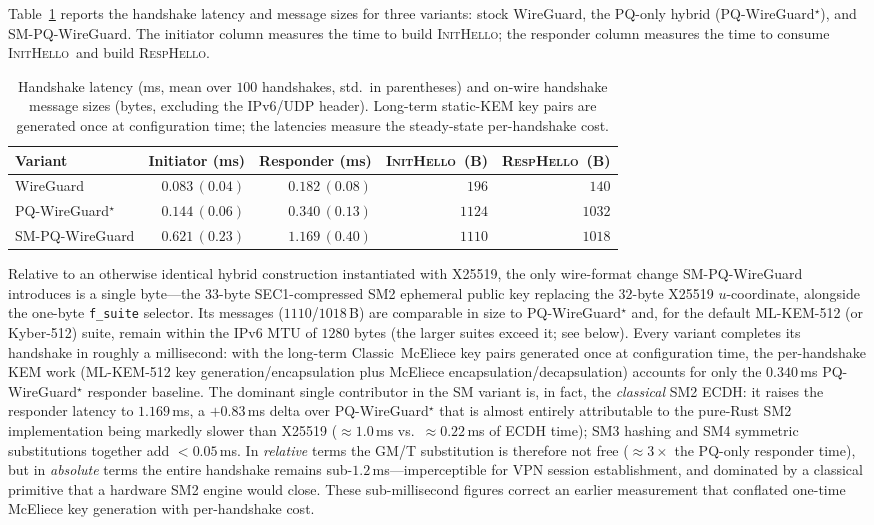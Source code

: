 \documentclass{SCIS2026}
\newcommand{\initmsg}{\textsc{InitHello}\xspace}
\newcommand{\respmsg}{\textsc{RespHello}\xspace}
\begin{document}
Table~\ref{tab:handshake} reports the handshake latency and message
sizes for three variants: stock WireGuard, the PQ-only hybrid
(PQ-WireGuard$^\star$), and SM-PQ-WireGuard.  The initiator column
measures the time to build \initmsg; the responder column measures the
time to consume \initmsg\ and build \respmsg.

\begin{table}[htbp]
\centering
\caption{Handshake latency (ms, mean over $100$ handshakes, std.\ in
parentheses) and on-wire handshake message sizes (bytes, excluding the
IPv6/UDP header).  Long-term static-KEM key pairs are generated once at
configuration time; the latencies measure the steady-state
per-handshake cost.}
\label{tab:handshake}
\footnotesize
\tabcolsep 5pt
\begin{tabular}{lrrrr}
\toprule
\textbf{Variant} & \textbf{Initiator (ms)} & \textbf{Responder (ms)}
                 & \textbf{\initmsg\ (B)} & \textbf{\respmsg\ (B)} \\
\midrule
WireGuard           & $0.083\,(0.04)$ & $0.182\,(0.08)$ & $196$  & $140$  \\
PQ-WireGuard$^\star$ & $0.144\,(0.06)$ & $0.340\,(0.13)$ & $1124$ & $1032$ \\
SM-PQ-WireGuard     & $0.621\,(0.23)$ & $1.169\,(0.40)$ & $1110$ & $1018$ \\
\bottomrule
\end{tabular}
\end{table}

Relative to an otherwise identical hybrid construction instantiated
with X25519, the only wire-format change SM-PQ-WireGuard introduces is
a single byte---the $33$-byte SEC1-compressed SM2 ephemeral public key
replacing the $32$-byte X25519 $u$-coordinate, alongside the one-byte
\texttt{f\_suite} selector.  Its messages ($1110$/$1018$\,B) are
comparable in size to PQ-WireGuard$^\star$ and, for the default
ML-KEM-512 (or Kyber-512) suite, remain within the
IPv6 MTU of $1280$ bytes (the larger suites exceed it; see below).  Every variant completes its handshake in
roughly a millisecond: with the long-term Classic~McEliece key pairs
generated once at configuration time, the per-handshake KEM work
(ML-KEM-512 key generation/encapsulation plus McEliece
encapsulation/decapsulation) accounts for only the $0.340$\,ms
PQ-WireGuard$^\star$ responder baseline.  The dominant single
contributor in the SM variant is, in fact, the \emph{classical} SM2
ECDH: it raises the responder latency to $1.169$\,ms, a
$+0.83$\,ms delta over PQ-WireGuard$^\star$ that is almost entirely
attributable to the pure-Rust SM2 implementation being markedly slower
than X25519 ($\approx 1.0$\,ms vs.\ $\approx 0.22$\,ms of ECDH time);
SM3 hashing and SM4 symmetric substitutions together add $<0.05$\,ms.
In \emph{relative} terms the GM/T substitution is therefore not free
($\approx 3\times$ the PQ-only responder time), but in \emph{absolute}
terms the entire handshake remains sub-$1.2$\,ms---imperceptible for
VPN session establishment, and dominated by a classical primitive that
a hardware SM2 engine would close.  These sub-millisecond figures
correct an earlier measurement that conflated one-time McEliece key
generation with per-handshake cost.
\end{document}
